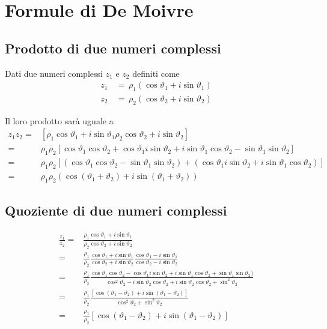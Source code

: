 \documentclass[../../dimostrazioni]{subfiles}
\begin{document}
    \chapter{Formule di De Moivre}

        \section*{Prodotto di due numeri complessi}

            Dati due numeri complessi \(z_1\) e \(z_2\) definiti come
            \begin{align*}
                z_1 \, &= \, \rho_1(\cos\vartheta_1 + i\sin\vartheta_1)\\
                z_2 \, &= \, \rho_2(\cos\vartheta_2 + i\sin\vartheta_2)
            \end{align*}

            Il loro prodotto sarà uguale a
            \begin{align*}
                z_1z_2 =& [\rho_1\cos\vartheta_1+i\sin\vartheta_1\rho_2\cos\vartheta_2+i\sin\vartheta_2] \\
                       =& \rho_1\rho_2 [\cos\vartheta_1\cos\vartheta_2 + \cos\vartheta_1i\sin\vartheta_2 + i\sin\vartheta_1\cos\vartheta_2 - \sin\vartheta_1\sin\vartheta_2] \\
                       =& \rho_1\rho_2 [(\cos\vartheta_1\cos\vartheta_2 - \sin\vartheta_1\sin\vartheta_2) + (\cos\vartheta_1 i\sin\vartheta_2 + i\sin\vartheta_1\cos\vartheta_2)] \\
                       =& \rho_1\rho_2 (\cos(\vartheta_1 + \vartheta_2) + i\sin(\vartheta_1 + \vartheta_2))
            \end{align*}

        \section*{Quoziente di due numeri complessi}

            \begin{align*}
                \frac{z_1}{z_2} =& \frac{\rho_1\cos\vartheta_1+i\sin\vartheta_1}{\rho_2\cos\vartheta_2+i\sin\vartheta_2} \\
                                =& \frac{\rho_1}{\rho_2} \frac{\cos\vartheta_1+i\sin\vartheta_1}{\cos\vartheta_2+i\sin\vartheta_2} \frac{\cos\vartheta_1-i\sin\vartheta_1}{\cos\vartheta_2-i\sin\vartheta_2}\\
                                =& \frac{\rho_1}{\rho_2} \frac{\cos\vartheta_1\cos\vartheta_2 - \cos\vartheta_1 i\sin\vartheta_2 + i\sin\vartheta_1\cos\vartheta_2 + \sin\vartheta_1\sin\vartheta_2)}{\cos^2\vartheta_2 - i\sin\vartheta_2\cos\vartheta_2 + i\sin\vartheta_2\cos\vartheta_2 + \sin^2\vartheta_2} \\
                                =& \frac{\rho_1}{\rho_2} \frac{[\cos(\vartheta_1 - \vartheta_2) + i\sin(\vartheta_1 - \vartheta_2)]}{\cos^2\vartheta_2 + \sin^2\vartheta_2} \\
                                =& \frac{\rho_1}{\rho_2} [\cos(\vartheta_1 - \vartheta_2) + i\sin(\vartheta_1 - \vartheta_2)]
            \end{align*}
\end{document}
